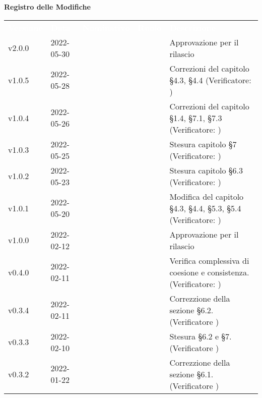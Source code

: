 
{\LARGE{\textbf{Registro delle Modifiche}}} \\
\renewcommand{\arraystretch}{1.5}
\begin{longtable}{ m{}<{\centering}  m{}<{\centering}  m{}<{\centering}  m{}<{\centering}  m{}<{\centering} }
	\rowcolor{darkblue}
	\textcolor{white}{\textbf{Versione}} &\textcolor{white}{\textbf{Data}}& \textcolor{white}{\textbf{Nominativo}} & \textcolor{white}{\textbf{Ruolo}}& \textcolor{white}{\textbf{Descrizione}} \\
	
	v2.0.0& 2022-05-30 & \GC & \RE{}  & Approvazione per il rilascio\\

	v1.0.5& 2022-05-28 & \EP & \AM{} & Correzioni del capitolo §4.3, §4.4 (Verificatore: \textit{\GC})\\

	v1.0.4& 2022-05-26 & \MB & \AM{} & Correzioni del capitolo §1.4, §7.1, §7.3 (Verificatore: \textit{\GC})\\

	v1.0.3& 2022-05-25 & \MB & \AM{} & Stesura capitolo §7 (Verificatore: \textit{\GC})\\

	v1.0.2& 2022-05-23 & \EP & \AM{} & Stesura capitolo §6.3 (Verificatore: \textit{\GC})\\

	v1.0.1& 2022-05-20 & \EP & \AM{} & Modifica del capitolo §4.3, §4.4, §5.3, §5.4 (Verificatore:  \textit{\GC})\\

	v1.0.0& 2022-02-12 & \GC & \RE{}  & Approvazione per il rilascio\\

	v0.4.0& 2022-02-11 & \EP{} & \AM {} & Verifica complessiva di coesione e consistenza. (Verificatore: \textit{\MG})\\	

	v0.3.4& 2022-02-11 & \EP{} & \AM{} & Correzzione della sezione §6.2. (Verificatore \textit{\MG}) \\

	v0.3.3& 2022-02-10 & \EP{} & \AM{} & Stesura §6.2 e \S{}7. (Verificatore \textit{\MG}) \\

	v0.3.2& 2022-01-22 & \EP{} & \AM{} & Correzzione della sezione §6.1. (Verificatore \textit{\MG}) \\


\end{longtable}
